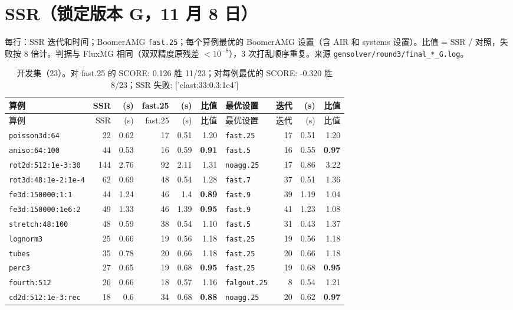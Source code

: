 \section{SSR（锁定版本 G，11 月 8 日）}
每行：SSR 迭代和时间；BoomerAMG \texttt{fast.25}；每个算例最优的 BoomerAMG 设置（含 AIR 和 systems 设置）。比值 = SSR / 对照，失败按 8 倍计。判据与 FluxMG 相同（双双精度原残差 $<10^{-8}$），3 次打乱顺序重复。来源 \texttt{gensolver/round3/final\_*\_G.log}。
{\scriptsize\setlength{\tabcolsep}{3pt}
\begin{longtable}{lrrrrrlrrr}
\caption{开发集（23）。对 fast.25 的 SCORE: 0.126  胜 11/23；对每例最优的 SCORE: -0.320  胜 8/23；SSR 失败: ['elast:33:0.3:1e4']}\\
\toprule
算例 & SSR & (s) & fast.25 & (s) & 比值 & 最优设置 & 迭代 & (s) & 比值 \\
\midrule
\endfirsthead
\toprule
算例 & SSR & (s) & fast.25 & (s) & 比值 & 最优设置 & 迭代 & (s) & 比值 \\
\midrule
\endhead
\bottomrule
\endlastfoot
\texttt{poisson3d:64} & 22 & 0.62 & 17 & 0.51 & 1.20 & \texttt{fast.25} & 17 & 0.51 & 1.20 \\
\texttt{aniso:64:100} & 44 & 0.53 & 16 & 0.59 & \textbf{0.91} & \texttt{fast.5} & 16 & 0.55 & \textbf{0.97} \\
\texttt{rot2d:512:1e-3:30} & 144 & 2.76 & 92 & 2.11 & 1.31 & \texttt{noagg.25} & 17 & 0.86 & 3.22 \\
\texttt{rot3d:48:1e-2:1e-4} & 62 & 0.69 & 48 & 0.54 & 1.28 & \texttt{fast.7} & 37 & 0.51 & 1.36 \\
\texttt{fe3d:150000:1:1} & 44 & 1.24 & 46 & 1.4 & \textbf{0.89} & \texttt{fast.9} & 39 & 1.19 & 1.04 \\
\texttt{fe3d:150000:1e6:2} & 49 & 1.33 & 46 & 1.39 & \textbf{0.95} & \texttt{fast.9} & 41 & 1.23 & 1.08 \\
\texttt{stretch:48:100} & 48 & 0.59 & 38 & 0.54 & 1.10 & \texttt{fast.5} & 31 & 0.43 & 1.37 \\
\texttt{lognorm3} & 25 & 0.66 & 19 & 0.56 & 1.18 & \texttt{fast.25} & 19 & 0.56 & 1.18 \\
\texttt{tubes} & 35 & 0.78 & 20 & 0.66 & 1.18 & \texttt{fast.25} & 20 & 0.66 & 1.18 \\
\texttt{perc3} & 27 & 0.65 & 19 & 0.68 & \textbf{0.95} & \texttt{fast.25} & 19 & 0.68 & \textbf{0.95} \\
\texttt{fourth:512} & 26 & 0.66 & 18 & 0.57 & 1.16 & \texttt{falgout.25} & 8 & 0.54 & 1.21 \\
\texttt{cd2d:512:1e-3:rec} & 18 & 0.6 & 34 & 0.68 & \textbf{0.88} & \texttt{noagg.25} & 20 & 0.62 & \textbf{0.97} \\

\end{longtable}}
